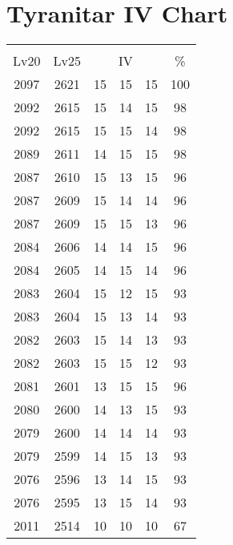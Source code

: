 \documentclass{article}%
\begin{document}
%
\normalsize%
\section{Tyranitar IV Chart}%
\label{sec:Tyranitar IV Chart}%
\renewcommand{\arraystretch}{1.5}%
\begin{tabular}{|c|c|c|c|c|c|}%
\hline%
\multicolumn{6}{|c|}{\textcolor{white}{ 
\linebreak{Tyranitar}
}%
\cellcolor{black}}\\%
\multicolumn{1}{|c}{Lv20}&\multicolumn{1}{c|}{Lv25}&\multicolumn{3}{c|}{IV}&\multicolumn{1}{|c|}{\%}\\%
\hline%
\rowcolor{color100}%
2097&2621&15&15&15&100\\%
\hline%
\rowcolor{color98}%
2092&2615&15&14&15&98\\%
\hline%
\rowcolor{color98}%
2092&2615&15&15&14&98\\%
\hline%
\rowcolor{color98}%
2089&2611&14&15&15&98\\%
\hline%
\rowcolor{color96}%
2087&2610&15&13&15&96\\%
\hline%
\rowcolor{color96}%
2087&2609&15&14&14&96\\%
\hline%
\rowcolor{color96}%
2087&2609&15&15&13&96\\%
\hline%
\rowcolor{color96}%
2084&2606&14&14&15&96\\%
\hline%
\rowcolor{color96}%
2084&2605&14&15&14&96\\%
\hline%
\rowcolor{color93}%
2083&2604&15&12&15&93\\%
\hline%
\rowcolor{color93}%
2083&2604&15&13&14&93\\%
\hline%
\rowcolor{color93}%
2082&2603&15&14&13&93\\%
\hline%
\rowcolor{color93}%
2082&2603&15&15&12&93\\%
\hline%
\rowcolor{color96}%
2081&2601&13&15&15&96\\%
\hline%
\rowcolor{color93}%
2080&2600&14&13&15&93\\%
\hline%
\rowcolor{color93}%
2079&2600&14&14&14&93\\%
\hline%
\rowcolor{color93}%
2079&2599&14&15&13&93\\%
\hline%
\rowcolor{color93}%
2076&2596&13&14&15&93\\%
\hline%
\rowcolor{color93}%
2076&2595&13&15&14&93\\%
\hline%
\rowcolor{color91}%
2011&2514&10&10&10&67\\%
\end{tabular}

%
\end{document}
